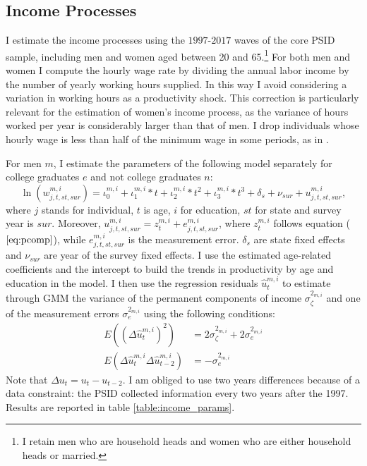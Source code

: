 \documentclass[12pt]{article}
\begin{document}
\subsection{Income Processes}
I estimate the income processes using the $1997$-$2017$ waves of the core PSID sample, including men and women aged between 20 and 65.\footnote{I retain men who are household heads and women who are either household heads or married.} For both men and women I compute the hourly wage rate by dividing the annual labor income by the number of yearly working hours supplied. In this way I avoid considering a variation in working hours as a productivity shock. This correction is particularly relevant for the estimation of women's income process, as the variance of hours worked per year is considerably larger than that of men. I drop individuals whose hourly wage is less than half of the minimum wage in some periods, as in \cite{low2018}.

For men $m$, I estimate the parameters of the following model separately for college graduates $e$ and not college graduates $n$:
\begin{equation}\label{eq:male_earn}
\ln(w^{m,i}_{j,t,st,sur})=\iota^{m,i}_0+\iota^{m,i}_1*t+\iota^{m,i}_2*t^2+\iota^{m,i}_3*t^3+\delta_s+\nu_{sur}+u_{j,t,st,sur}^{m,i},
\end{equation}
where $j$ stands for individual, $t$ is age, $i$ for education, $st$ for state and survey year is $sur$. Moreover, $u_{j,t,st,sur}^{m,i}=z_t^{m,i}+e^{m,i}_{j,t,st,sur}$, where $z_t^{m,i}$ follows equation ($\ref{eq:pcomp}$), while $e^{m,i}_{j,t,st,sur}$ is the measurement error. $\delta_s$ are state fixed effects and $\nu_{sur}$ are year of the survey fixed effects. I use the estimated age-related coefficients and the intercept to build the trends in productivity by age and education in the model. I then use the regression residuals $\hat{u}_{t}^{m,i}$ to estimate through GMM the variance of the permanent components of income $\sigma_\zeta^{2_{m,i}}$ and one of the measurement errors $\sigma_e^{2_{m,i}}$ using the following conditions:
\begin{equation}\label{eq:male_gmm}
\begin{split}
E((\Delta\hat{u}_{t}^{m,i})^2)&=2\sigma_\zeta^{2_{m,i}}+2\sigma_e^{2_{m,i}}\\
E(\Delta\hat{u}_{t}^{m,i}\Delta\hat{u}_{t-2}^{m,i})&=-\sigma_e^{2_{m,i}}
\end{split}
\end{equation}
Note that $\Delta u_t=u_t-u_{t-2}$. I am obliged to use two years differences because of a data constraint: the PSID collected information every two years after the 1997. Results are reported in table \ref{table:income_params}.
\end{document}
